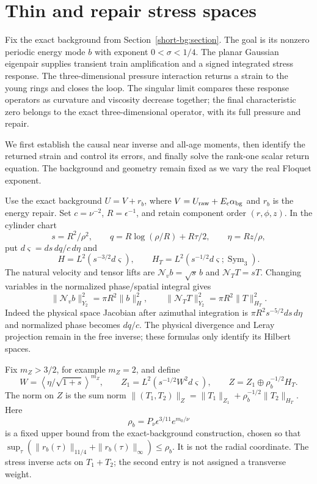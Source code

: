 \section{Thin and repair stress spaces}
\label{sec:stress-spaces-short}

Fix the exact background from Section~\ref{short-bg:section}. The goal is
its nonzero periodic energy mode $b$ with exponent $0<\sigma<1/4$.
The planar Gaussian eigenpair supplies transient train amplification
and a signed integrated stress response. The three-dimensional pressure
interaction returns a strain to the young rings and closes the loop.
The singular limit compares these response operators as curvature and
viscosity decrease together; the final characteristic zero belongs to
the exact three-dimensional operator, with its full pressure and repair.

We first establish the causal near inverse and all-age moments, then
identify the returned strain and control its errors, and finally solve
the rank-one scalar return equation. The background and geometry remain
fixed as we vary the real Floquet exponent.

Use the exact background
$U=V+r_b$, where $V=U_{\rm raw}+E_\epsilon\alpha_{\rm bg}$
and $r_b$ is the energy repair. Set $c=\nu^{-2}$, $R=\epsilon^{-1}$,
and retain component order $(r,\phi,z)$. In the cylinder chart
\[
 s=R^2/\rho^2,\qquad q=R\log(\rho/R)+R\tau/2,\qquad
 \eta=Rz/\rho,
\]
put $d\varsigma=ds\,dq/c\,d\eta$ and
\[
 H=L^2(s^{-3/2}d\varsigma),\qquad
 H_T=L^2(s^{-1/2}d\varsigma;\operatorname{Sym}_3).
\]
The natural velocity and tensor lifts are
$\mathcal N_vb=\sqrt{s}\,b$ and $\mathcal N_TT=sT$.
Changing variables in the normalized phase/spatial integral gives
\begin{equation}\label{stress-short:lifts}
 \|\mathcal N_vb\|_{Y_2}^2=\pi R^2\|b\|_H^2,\qquad
 \|\mathcal N_TT\|_{Y_2}^2=\pi R^2\|T\|_{H_T}^2.
\end{equation}
Indeed the physical space Jacobian after azimuthal integration is
$\pi R^2s^{-5/2}ds\,d\eta$ and normalized phase becomes $dq/c$.
The physical divergence and Leray projection remain in the free inverse;
these formulas only identify its Hilbert spaces.

Fix $m_Z>3/2$, for example $m_Z=2$, and define
\[
 W=\left\langle\eta/\sqrt{1+s}\right\rangle^{m_Z},\qquad
 Z_1=L^2(s^{-1/2}W^2d\varsigma),\qquad
 Z=Z_1\oplus\rho_b^{-1/2}H_T.
\]
The norm on $Z$ is the sum norm
$\|(T_1,T_2)\|_Z=\|T_1\|_{Z_1}+\rho_b^{-1/2}\|T_2\|_{H_T}$.
Here
\[
 \rho_b=P_\nu\epsilon^{3/11}e^{m_0/\nu}
\]
is a fixed upper bound from the exact-background construction,
chosen so that
$\sup_\tau(\|r_b(\tau)\|_{11/4}+\|r_b(\tau)\|_\infty)\le\rho_b$.
It is not the radial coordinate. The stress inverse acts on
$T_1+T_2$; the second entry is not assigned a transverse weight.

